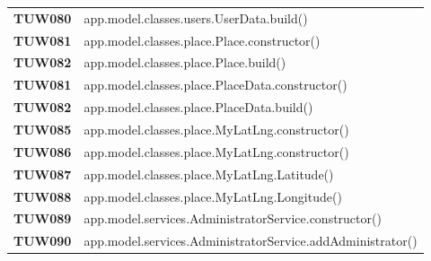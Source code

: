 \documentclass[../../piano-di-qualifica.tex]{subfiles}
\begin{document}
\begin{longtable}[H]{>{\centering\bfseries}m{3cm} >{}m{13cm}}
  TUW080             & app.model.classes.users.UserData.build\@()                                                              \\


  TUW081             & app.model.classes.place.Place.constructor\@()                                                           \\

  TUW082             & app.model.classes.place.Place.build\@()                                                                 \\


  TUW081             & app.model.classes.place.PlaceData.constructor\@()                                                       \\

  TUW082             & app.model.classes.place.PlaceData.build\@()                                                             \\


  TUW085             & app.model.classes.place.MyLatLng.constructor\@()                                                        \\

  TUW086             & app.model.classes.place.MyLatLng.constructor\@()                                                        \\

  TUW087             & app.model.classes.place.MyLatLng.Latitude\@()                                                           \\

  TUW088             & app.model.classes.place.MyLatLng.Longitude\@()                                                          \\


  TUW089             & app.model.services.AdministratorService.constructor\@()                                                 \\

  TUW090             & app.model.services.AdministratorService.addAdministrator\@()                                            \\


\end{longtable}
\end{document}
